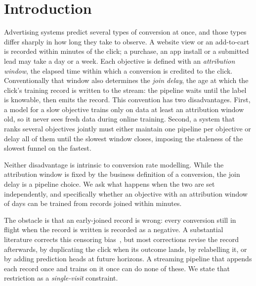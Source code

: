 \section{Introduction}
\label{sec:intro}

Advertising systems predict several types of conversion at once, and those types differ sharply
in how long they take to observe. A website view or an add-to-cart is recorded within minutes of
the click; a purchase, an app install or a submitted lead may take a day or a week. Each
objective is defined with an \emph{attribution window}, the elapsed time within which a
conversion is credited to the click. Conventionally that window also determines the \emph{join
delay}, the age at which the click's training record is written to the stream: the pipeline
waits until the label is knowable, then emits the record. This convention has two disadvantages.
First, a model for a slow objective trains only on data at least an attribution window old, so
it never sees fresh data during online training. Second, a system that ranks several objectives
jointly must either maintain one pipeline per objective or delay all of them until the slowest
window closes, imposing the staleness of the slowest funnel on the fastest.

Neither disadvantage is intrinsic to conversion rate modelling. While the attribution window is
fixed by the business definition of a conversion, the join delay is a pipeline choice. We ask
what happens when the two are set independently, and specifically whether an objective with an
attribution window of days can be trained from records joined within minutes.

The obstacle is that an early-joined record is wrong: every conversion still in flight when the
record is written is recorded as a negative. A substantial literature corrects this censoring
bias~\cite{chapelle2014modeling,yasui2020feedback,yang2021capturing,chen2022asymptotically,ding2026delayed},
but most corrections revise the record afterwards, by duplicating the click when its outcome
lands, by relabelling it, or by adding prediction heads at future horizons. A streaming pipeline
that appends each record once and trains on it once can do none of these. We state that
restriction as a \emph{single-visit} constraint.

